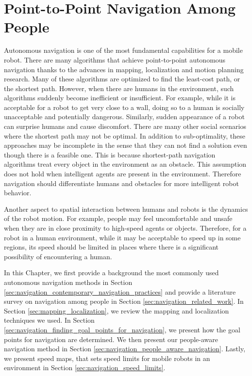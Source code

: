 

\chapter{Point-to-Point Navigation Among People}
\label{chapter:navigation_among_people}

Autonomous navigation is one of the most fundamental capabilities for a mobile robot. There are many algorithms that achieve point-to-point autonomous navigation thanks to the advances in mapping, localization and motion planning research. Many of these algorithms are optimized to find the least-cost path, or the shortest path. However, when there are humans in the environment, such algorithms suddenly become inefficient or insufficient. For example, while it is acceptable for a robot to get very close to a wall, doing so to a human is socially unacceptable and potentially dangerous. Similarly, sudden appearance of a robot can surprise humans and cause discomfort. There are many other social scenarios where the shortest path may not be optimal. In addition to sub-optimality, these approaches may be incomplete in the sense that they can not find a solution even though there is a feasible one. This is because shortest-path navigation algorithms treat every object in the environment as an obstacle. This assumption does not hold when intelligent agents are present in the environment. Therefore navigation should differentiate humans and obstacles for more intelligent robot behavior.

Another aspect to spatial interaction between humans and robots is the dynamics of the robot motion. For example, people may feel uncomfortable and unsafe when they are in close proximity to high-speed agents or objects. Therefore, for a robot in a human environment, while it may be acceptable to speed up in some regions, its speed should be limited in places where there is a significant possibility of encountering a human.

In this Chapter, we first provide a background the most commonly used autonomous navigation methods in Section \ref{sec:navigation_contemporary_navigation_practices} and provide a literature survey on navigation among people in Section \ref{sec:navigation_related_work}. In Section \ref{sec:mapping_localization}, we review the mapping and localization techniques we used. In Section \ref{sec:navigation_finding_goal_points_for_navigation}, we present how the goal points for navigation are determined. We then present our people-aware navigation method in Section \ref{sec:navigation_people_aware_navigation}. Lastly, we present speed maps, that sets speed limits for mobile robots in an environment in Section \ref{sec:navigation_speed_limits}.


